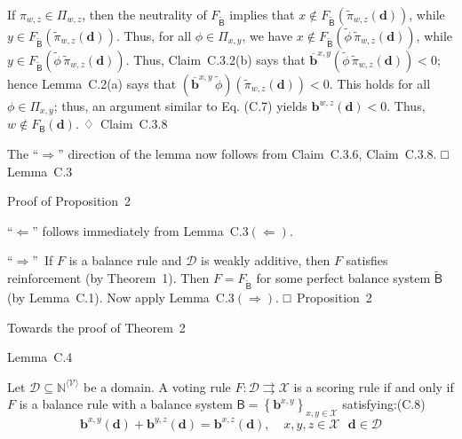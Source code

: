 \documentclass[
]{article}
\begin{document}
If \(\pi_{w,z} \in \Pi_{w,z}\), then the neutrality of
\(F_{\widetilde{\mathsf{B}}}\) implies that
\(x \notin F_{\widetilde{\mathsf{B}}}\left( {\widetilde{\pi}}_{w,z}\left( \mathbf{d} \right) \right)\),
while
\(y \in F_{\widetilde{\mathsf{B}}}\left( {\widetilde{\pi}}_{w,z}\left( \mathbf{d} \right) \right)\).
Thus, for all \(\phi \in \Pi_{x,y}\), we have
\(x \notin F_{\widetilde{\mathsf{B}}}\left( \widetilde{\phi}\,{\widetilde{\pi}}_{w,z}\left( \mathbf{d} \right) \right)\),
while
\(y \in F_{\widetilde{\mathsf{B}}}\left( \widetilde{\phi}\,{\widetilde{\pi}}_{w,z}\left( \mathbf{d} \right) \right)\).
Thus, Claim~C.3.2(b) says that
\({\overline{\mathbf{b}}}^{x,y}\left( \widetilde{\phi}\,{\widetilde{\pi}}_{w,z}\left( \mathbf{d} \right) \right) < 0\);
hence Lemma~C.2(a) says that
\(\left( {\overline{\mathbf{b}}}^{x,y}\,\widetilde{\phi} \right)\left( {\widetilde{\pi}}_{w,z}\left( \mathbf{d} \right) \right) < 0\).
This holds for all \(\phi \in \Pi_{x,y}\); thus, an argument similar to
Eq. (C.7) yields \(\mathbf{b}^{w,z}\left( \mathbf{d} \right) < 0\).
Thus, \(w \notin F_{\mathsf{B}}\left( \mathbf{d} \right)\).
♢~Claim~C.3.8

The ``\(\Longrightarrow\)'' direction of the lemma now follows from
Claim~C.3.6, Claim~C.3.8. □ Lemma~C.3

Proof of Proposition~2

``\(\Longleftarrow\)'' follows immediately from
Lemma~C.3\(\left( \Leftarrow \right)\).

``\(\Longrightarrow\)''~If \(F\) is a balance rule and \(\mathcal{D}\)
is weakly additive, then \(F\) satisfies reinforcement (by Theorem~1).
Then \(F = F_{\widetilde{\mathsf{B}}}\) for some perfect balance system
\(\widetilde{\mathsf{B}}\) (by Lemma~C.1). Now apply
Lemma~C.3\(\left( \Rightarrow \right)\). □~Proposition~2

\protect{}\label{s000050}
Towards the proof of Theorem~2

Lemma~C.4

Let \(\mathcal{D} \subseteq \mathbb{N}^{\langle\mathcal{V}\rangle}\) be
a domain. A voting rule
\(\left. F:\mathcal{D}\rightrightarrows\mathcal{X} \right.\) is a
scoring rule if and only if \(F\) is a balance rule with a balance
system
\(\mathsf{B} = \left\{ \mathbf{b}^{x,y} \right\}_{x,y \in \mathcal{X}}\)
satisfying:(C.8)\[\mathbf{b}^{x,y}\left( \mathbf{d} \right) + \mathbf{b}^{y,z}\left( \mathbf{d} \right) = \mathbf{b}^{x,z}\left( \mathbf{d} \right)\text{,}\quad\ x,y,z \in \mathcal{X}\text{~~}\mathbf{d} \in \mathcal{D}\]
\end{document}
